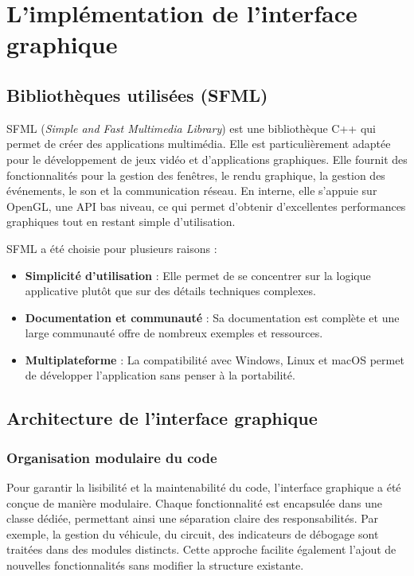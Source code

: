 \section{L'implémentation de l'interface graphique}\label{sec:l'implementation-de-l-interface-graphique}
\subsection{Bibliothèques utilisées (SFML)}\label{subsec:sfml}
SFML (\textit{Simple and Fast Multimedia Library}) est une bibliothèque C++ qui permet de créer des applications multimédia.
Elle est particulièrement adaptée pour le développement de jeux vidéo et d'applications graphiques.
Elle fournit des fonctionnalités pour la gestion des fenêtres, le rendu graphique, la gestion des événements, le son et la communication réseau.
En interne, elle s'appuie sur OpenGL, une API bas niveau, ce qui permet d'obtenir d'excellentes performances graphiques tout en restant simple d'utilisation.

SFML a été choisie pour plusieurs raisons :
\begin{itemize}
    \item \textbf{Simplicité d'utilisation} : Elle permet de se concentrer sur la logique applicative plutôt que sur des détails techniques complexes.
    \item \textbf{Documentation et communauté} : Sa documentation\cite{documentationSFML} est complète et une large communauté offre de nombreux exemples et ressources.
    \item \textbf{Multiplateforme} : La compatibilité avec Windows, Linux et macOS permet de développer l'application sans penser à la portabilité.
\end{itemize}

\subsection{Architecture de l'interface graphique}\label{subsec:architecture-de-l-interface-graphique}
\subsubsection{Organisation modulaire du code}\label{subsubsec:organisation-modulaire-du-code}
Pour garantir la lisibilité et la maintenabilité du code, l'interface graphique a été conçue de manière modulaire.
Chaque fonctionnalité est encapsulée dans une classe dédiée, permettant ainsi une séparation claire des responsabilités.
Par exemple, la gestion du véhicule, du circuit, des indicateurs de débogage sont traitées dans des modules distincts.
Cette approche facilite également l'ajout de nouvelles fonctionnalités sans modifier la structure existante.


